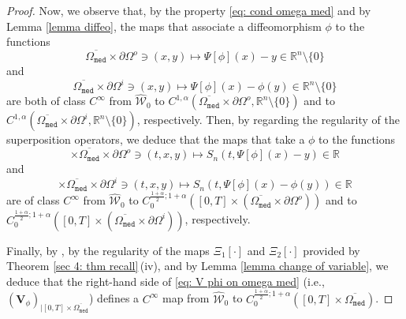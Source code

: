 \documentclass[11pt,reqno,a4paper]{amsart}
\theoremstyle{plain}
\theoremstyle{definition}
\newcommand{\R}{\mathbb{R}}
\begin{document}
\begin{proof}
    Now, we observe that, by the property \eqref{eq: cond omega med} and by Lemma \ref{lemma diffeo}, the maps that associate a diffeomorphism $\phi$ to the functions
    \begin{equation*}
        \overline{\Omega_\mathtt{med}} \times \partial\Omega^o \ni (x,y) \longmapsto \Psi[\phi](x) - y \in \R^n \setminus\{0\}
    \end{equation*}
    and
    \begin{equation*}
        \overline{\Omega_\mathtt{med}} \times \partial\Omega^i \ni (x,y) \longmapsto \Psi[\phi](x) -\phi(y) \in \R^n \setminus\{0\}
    \end{equation*}
    are both of class $C^{\infty}$ from $\widehat{\mathcal{W}}_0$ to $C^{1,\alpha}(\overline{\Omega_\mathtt{med}} \times \partial\Omega^o, \R^n \setminus\{0\})$ and to $C^{1,\alpha}(\overline{\Omega_\mathtt{med}} \times \partial\Omega^i, \R^n \setminus\{0\})$, respectively. 
    Then, by \cite[Lems.\,A.1\,\&\,A.3]{DaLu23} regarding the regularity of the superposition operators, we deduce that the maps that take a $\phi$ to the functions
    \begin{equation*}
        [0,T] \times \overline{\Omega_\mathtt{med}} \times \partial\Omega^o \ni (t,x,y) \longmapsto S_n (t,\Psi[\phi](x) - y) \in \R 
    \end{equation*}
    and
    \begin{equation*}
        [0,T] \times \overline{\Omega_\mathtt{med}} \times \partial\Omega^i \ni (t,x,y) \longmapsto S_n (t,\Psi[\phi](x) - \phi(y)) \in \R 
    \end{equation*}
    are of class $C^{\infty}$ from $\widehat{\mathcal{W}}_0$ to $C_0^{\frac{1+\alpha}{2}; 1+\alpha}([0,T] \times (\overline{\Omega_\mathtt{med}} \times \partial\Omega^o))$ and to $C_0^{\frac{1+\alpha}{2}; 1+\alpha}([0,T] \times (\overline{\Omega_\mathtt{med}} \times \partial\Omega^i))$, respectively.

    Finally, by \cite[Lem.\,A.2]{DaLu23}, by the regularity of the maps $\Xi_1[\cdot]$ and $\Xi_2[\cdot]$ provided by Theorem \ref{sec 4: thm recall}\,(iv), and by Lemma \ref{lemma change of variable}, we deduce that the right-hand side of \eqref{eq: V phi on omega med} (i.e., $(\mathbf{V}_\phi)_{|[0, T] \times \overline{\Omega_{\mathtt{med}}}}$) defines a $C^\infty$ map from $\widehat{\mathcal{W}}_0$ to $C_0^{\frac{1+\alpha}{2}; 1+\alpha}([0,T] \times \overline{\Omega_\mathtt{med}})$.


\end{proof}
\end{document}
